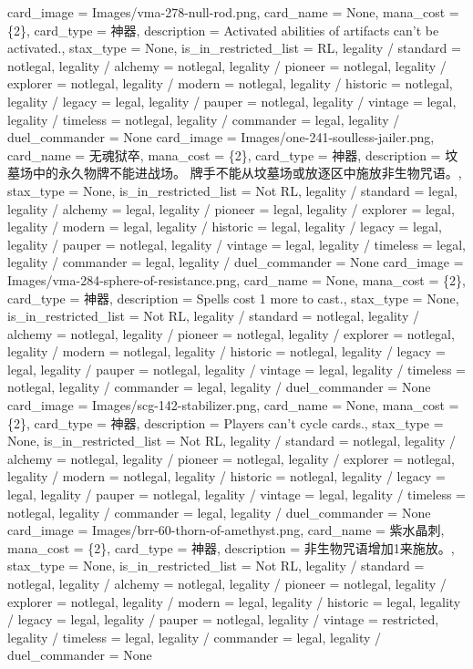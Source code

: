 \documentclass[lang = cn, color = black, 10pt]{AllThatStax}
\begin{document}
\card
{
	card_image = Images/vma-278-null-rod.png,
	card_name = None,
	mana_cost = \{2\},
	card_type = 神器,
	description = Activated abilities of artifacts can't be activated.,
	stax_type = None,
	is_in_restricted_list = RL,
	legality / standard = notlegal,
	legality / alchemy = notlegal,
	legality / pioneer = notlegal,
	legality / explorer = notlegal,
	legality / modern = notlegal,
	legality / historic = notlegal,
	legality / legacy = legal,
	legality / pauper = notlegal,
	legality / vintage = legal,
	legality / timeless = notlegal,
	legality / commander = legal,
	legality / duel_commander = None
}
\card
{
	card_image = Images/one-241-soulless-jailer.png,
	card_name = 无魂狱卒,
	mana_cost = \{2\},
	card_type = 神器,
	description = 坟墓场中的永久物牌不能进战场。
	牌手不能从坟墓场或放逐区中施放非生物咒语。,
	stax_type = None,
	is_in_restricted_list = Not RL,
	legality / standard = legal,
	legality / alchemy = legal,
	legality / pioneer = legal,
	legality / explorer = legal,
	legality / modern = legal,
	legality / historic = legal,
	legality / legacy = legal,
	legality / pauper = notlegal,
	legality / vintage = legal,
	legality / timeless = legal,
	legality / commander = legal,
	legality / duel_commander = None
}
\card
{
	card_image = Images/vma-284-sphere-of-resistance.png,
	card_name = None,
	mana_cost = \{2\},
	card_type = 神器,
	description = Spells cost {1} more to cast.,
	stax_type = None,
	is_in_restricted_list = Not RL,
	legality / standard = notlegal,
	legality / alchemy = notlegal,
	legality / pioneer = notlegal,
	legality / explorer = notlegal,
	legality / modern = notlegal,
	legality / historic = notlegal,
	legality / legacy = legal,
	legality / pauper = notlegal,
	legality / vintage = legal,
	legality / timeless = notlegal,
	legality / commander = legal,
	legality / duel_commander = None
}
\card
{
	card_image = Images/scg-142-stabilizer.png,
	card_name = None,
	mana_cost = \{2\},
	card_type = 神器,
	description = Players can't cycle cards.,
	stax_type = None,
	is_in_restricted_list = Not RL,
	legality / standard = notlegal,
	legality / alchemy = notlegal,
	legality / pioneer = notlegal,
	legality / explorer = notlegal,
	legality / modern = notlegal,
	legality / historic = notlegal,
	legality / legacy = legal,
	legality / pauper = notlegal,
	legality / vintage = legal,
	legality / timeless = notlegal,
	legality / commander = legal,
	legality / duel_commander = None
}
\card
{
	card_image = Images/brr-60-thorn-of-amethyst.png,
	card_name = 紫水晶刺,
	mana_cost = \{2\},
	card_type = 神器,
	description = 非生物咒语增加{1}来施放。,
	stax_type = None,
	is_in_restricted_list = Not RL,
	legality / standard = notlegal,
	legality / alchemy = notlegal,
	legality / pioneer = notlegal,
	legality / explorer = notlegal,
	legality / modern = legal,
	legality / historic = legal,
	legality / legacy = legal,
	legality / pauper = notlegal,
	legality / vintage = restricted,
	legality / timeless = legal,
	legality / commander = legal,
	legality / duel_commander = None
}
\end{document}
